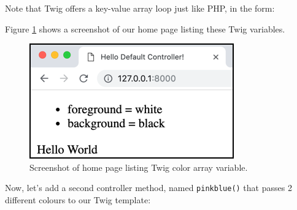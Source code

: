 \documentclass[a4paperpaper,openright]{book}
\newenvironment{Shaded}{}{}
\newcommand{\AnnotationTok}[1]{\textcolor[rgb]{0.38,0.63,0.69}{\textbf{\textit{#1}}}}
\newcommand{\CommentTok}[1]{\textcolor[rgb]{0.38,0.63,0.69}{\textit{#1}}}
\newcommand{\KeywordTok}[1]{\textcolor[rgb]{0.00,0.44,0.13}{\textbf{#1}}}
\newcommand{\NormalTok}[1]{#1}
\newcommand{\OtherTok}[1]{\textcolor[rgb]{0.00,0.44,0.13}{#1}}
\newcommand{\StringTok}[1]{\textcolor[rgb]{0.25,0.44,0.63}{#1}}
\begin{document}
Note that Twig offers a key-value array loop just like PHP, in the form:

\begin{Shaded}
\begin{Highlighting}[]
\NormalTok{    \{%
\end{Highlighting}
\end{Shaded}

Figure \ref{twig_blackwhite} shows a screenshot of our home page listing
these Twig variables.

\begin{figure}
\centering
\includegraphics{./tex2pdf.-8aed53dcd332a606/685d4f89bf346bb223565ae18fae3a64be9f00e9.png}
\caption{Screenshot of home page listing Twig color array variable.
\label{twig_blackwhite}}
\end{figure}

Now, let's add a second controller method, named \texttt{pinkblue()}
that passes 2 different colours to our Twig template:

\begin{Shaded}
\end{Shaded}
\end{document}
